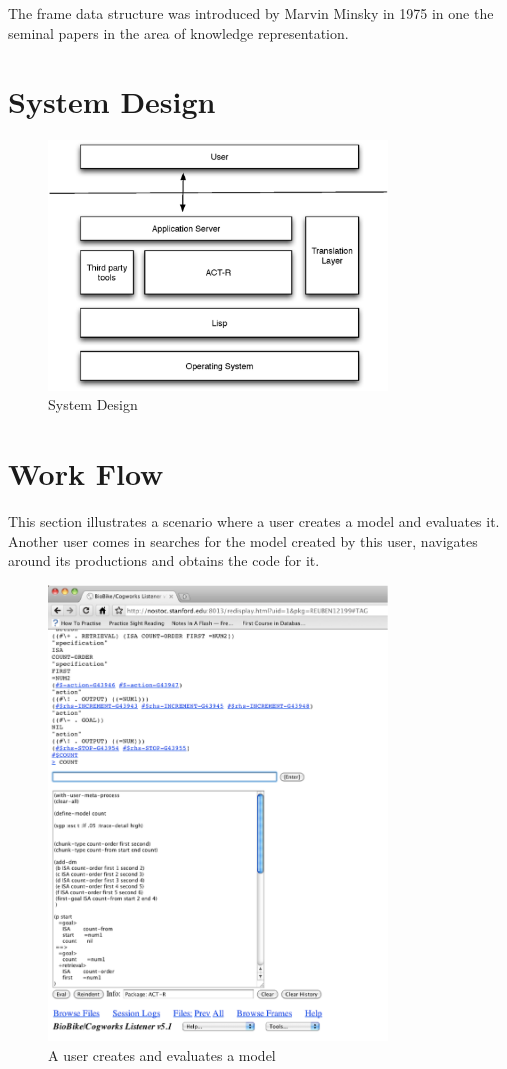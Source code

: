 The frame data structure was introduced by Marvin
Minsky\cite{Minsky1974a} in 1975 in one the seminal papers in the area
of knowledge representation.

\section{System Design}

\begin{figure}[htp]
  \centering
  \includegraphics[width=90mm]{SystemOverview}
  \caption{System Design}
  \label{SysOverview}
\end{figure}


\section{Work Flow}

This section illustrates a scenario where a user creates a model and
evaluates it. Another user comes in searches for the model created by
this user, navigates around its productions and obtains the code for
it. 

\begin{figure}[htp]
  \centering
  \includegraphics[width=90mm]{UserCreatesModel}
  \caption{A user creates and evaluates a model}
  \label{UserCreatesModel}
\end{figure}

